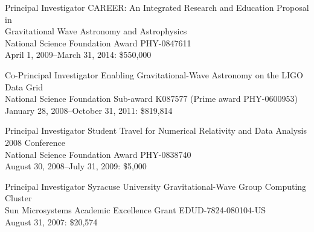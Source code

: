 \documentclass{cv}
\begin{document}
\begin{wideentry}
\item[Principal Investigator]{CAREER: An Integrated Research and Education
Proposal in \\Gravitational Wave Astronomy and Astrophysics}\\
{\small National Science Foundation Award PHY-0847611\\
April 1, 2009--March 31, 2014: \$550,000}

\item[Co-{Principal} Investigator]{Enabling Gravitational-Wave Astronomy on the LIGO Data
Grid}\\
{\small National Science Foundation Sub-award K087577 (Prime award PHY-0600953)\\
January 28, 2008--October 31, 2011: \$819,814}

\item[Principal Investigator]{Student Travel for Numerical Relativity and Data Analysis 2008 Conference}\\
{\small National Science Foundation Award PHY-0838740\\
August 30, 2008--July 31, 2009: \$5,000}


\item[Principal Investigator]{Syracuse University Gravitational-Wave Group 
Computing\\ Cluster}\\
{\small Sun Microsystems Academic Excellence Grant EDUD-7824-080104-US\\
August 31, 2007: \$20,574}

\end{wideentry}
\end{document}

